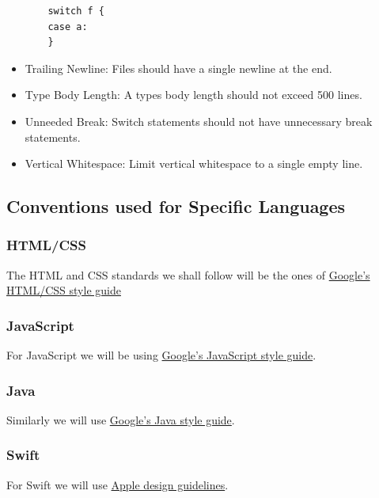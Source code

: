\documentclass[12pt]{article}
\begin{document}
\begin{itemize}
\begin{verbatim}
    switch f {
    case a:
    }
    \end{verbatim}
  \item Trailing Newline:\newline
    Files should have a single newline at the end. \newline
     \newline
  \item Type Body Length:\newline
    A types body length should not exceed 500 lines. \newline
     \newline
  \item Unneeded Break:\newline
    Switch statements should not have unnecessary break statements. \newline
     \newline
  \item Vertical Whitespace:\newline
    Limit vertical whitespace to a single empty line. \newline
  \end{itemize} \newpage
  \subsection{Conventions used for Specific Languages}
  \subsubsection{HTML/CSS}
  The HTML and CSS standards we shall follow will be the ones of \href{https://google.github.io/styleguide/htmlcssguide.html}{Google's HTML/CSS style guide}

  \subsubsection{JavaScript}
  For JavaScript we will be using \href{https://google.github.io/styleguide/jsguide.html}{Google's JavaScript style guide}.

  \subsubsection{Java}
  Similarly we will use \href{https://google.github.io/styleguide/javaguide.html}{Google's Java style guide}.

  \subsubsection{Swift}
  For Swift we will use \href{https://swift.org/documentation/api-design-guidelines/}{Apple design guidelines}.
\end{document}
